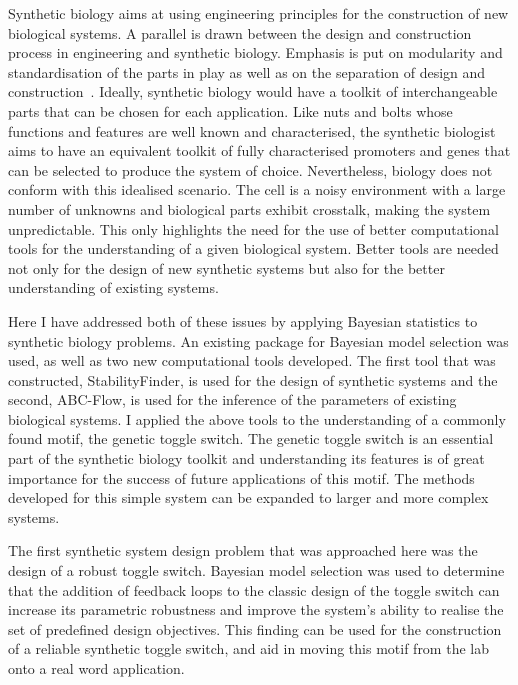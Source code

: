 Synthetic biology aims at using engineering principles for the construction of new biological systems. A parallel is drawn between the design and construction process in engineering and synthetic biology. Emphasis is put on modularity and standardisation of the parts in play as well as on the separation of design and construction~\autocite{Agapakis:2009bt}. Ideally, synthetic biology would have a toolkit of interchangeable parts that can be chosen for each application. Like nuts and bolts whose functions and features are well known and characterised, the synthetic biologist aims to have an equivalent toolkit of fully characterised promoters and genes that can be selected to produce the system of choice. Nevertheless, biology does not conform with this idealised scenario. The cell is a noisy environment with a large number of unknowns and biological parts exhibit crosstalk, making the system unpredictable. This only highlights the need for the use of better computational tools for the understanding of a given biological system. Better tools are needed not only for the design of new synthetic systems but also for the better understanding of existing systems.     

Here I have addressed both of these issues by applying Bayesian statistics to synthetic biology problems. An existing package for Bayesian model selection was used, as well as two new computational tools developed. The first tool that was constructed, StabilityFinder, is used for the design of synthetic systems and the second, ABC-Flow, is used for the inference of the parameters of existing biological systems. I applied the above tools to the understanding of a commonly found motif, the genetic toggle switch. The genetic toggle switch is an essential part of the synthetic biology toolkit and understanding its features is of great importance for the success of future applications of this motif. The methods developed for this simple system can be expanded to larger and more complex systems.

The first synthetic system design problem that was approached here was the design of a robust toggle switch. Bayesian model selection was used to determine that the addition of feedback loops to the classic design of the toggle switch can increase its parametric robustness and improve the system's ability to realise the set of predefined design objectives. This finding can be used for the construction of a reliable synthetic toggle switch, and aid in moving this motif from the lab onto a real word application.   

